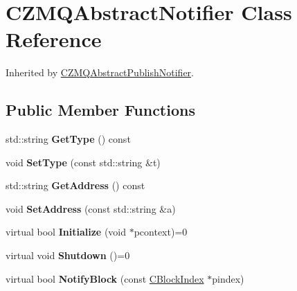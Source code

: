 \hypertarget{class_c_z_m_q_abstract_notifier}{}\section{C\+Z\+M\+Q\+Abstract\+Notifier Class Reference}
\label{class_c_z_m_q_abstract_notifier}


Inherited by \mbox{\hyperlink{class_c_z_m_q_abstract_publish_notifier}{C\+Z\+M\+Q\+Abstract\+Publish\+Notifier}}.

\subsection*{Public Member Functions}
\begin{DoxyCompactItemize}
\item 
\mbox{\label{class_c_z_m_q_abstract_notifier_a046ca6a48d0174e64ac8011382df4275}} 
std\+::string {\bfseries Get\+Type} () const
\item 
\mbox{\label{class_c_z_m_q_abstract_notifier_ab4179b7aeac89ce1a9214a46b21a4899}} 
void {\bfseries Set\+Type} (const std\+::string \&t)
\item 
\mbox{\label{class_c_z_m_q_abstract_notifier_a9ff17afd5effbe071af0a31a6bd31eb7}} 
std\+::string {\bfseries Get\+Address} () const
\item 
\mbox{\label{class_c_z_m_q_abstract_notifier_a6ada06e94b36fb8c872ad880ae2eb3d6}} 
void {\bfseries Set\+Address} (const std\+::string \&a)
\item 
\mbox{\label{class_c_z_m_q_abstract_notifier_a877029827c0b1224bf0826a2e433e370}} 
virtual bool {\bfseries Initialize} (void $\ast$pcontext)=0
\item 
\mbox{\label{class_c_z_m_q_abstract_notifier_a08713a9b91625eb86b400523fef3b2c6}} 
virtual void {\bfseries Shutdown} ()=0
\item 
\mbox{\label{class_c_z_m_q_abstract_notifier_a85c604b1fb2559c98b04a4c885b96192}} 
virtual bool {\bfseries Notify\+Block} (const \mbox{\hyperlink{class_c_block_index}{C\+Block\+Index}} $\ast$pindex)

\end{DoxyCompactItemize}
